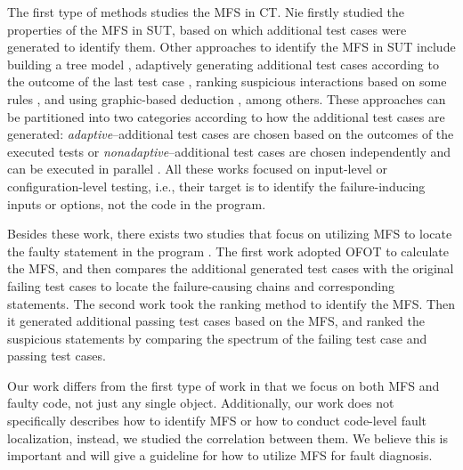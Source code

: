 \documentclass{sig-alternate-05-2015}
\begin{document}
The first type of methods studies the MFS in CT. Nie \cite{nie2011minimal} firstly studied the properties of the MFS in SUT, based on which additional test cases were generated to identify them. Other approaches to identify the MFS in SUT include building a tree model \cite{yilmaz2006covering}, adaptively generating additional test cases according to the outcome of the last test case \cite{zhang2011characterizing}, ranking suspicious interactions based on some rules \cite{ghandehari2012identifying}, and using graphic-based deduction \cite{martinez2008algorithms}, among others. These approaches can be partitioned into two categories \cite{colbourn2008locating} according to how the additional test cases are generated: \emph{adaptive}--additional test cases are chosen based on the outcomes of the executed tests \cite{shi2005software,nie2011minimal,ghandehari2012identifying,niu2013identifying,zhang2011characterizing,shakya2012isolating,wang2010adaptive,li2012improved}or \emph{nonadaptive}--additional test cases are chosen independently and can be executed in parallel \cite{yilmaz2006covering,colbourn2008locating,martinez2008algorithms,martinez2009locating,zhang2012faulty}. All these works focused on input-level or configuration-level testing, i.e., their target is to identify the failure-inducing inputs or options, not the code in the program.

Besides these work, there exists two studies that focus on utilizing MFS to locate the faulty statement in the program \cite{ma2013locating,ghandehari2013fault}. The first work \cite{ma2013locating} adopted OFOT \cite{nie2011minimal} to calculate the MFS, and then compares the additional generated test cases with the original failing test cases to locate the failure-causing chains and corresponding statements. The second work \cite{ghandehari2013fault} took the ranking method \cite{ghandehari2012identifying} to identify the MFS. Then  it generated additional passing test cases based on the MFS, and ranked the suspicious statements by comparing the spectrum of the failing test case and passing test cases.

Our work differs from the first type of work in that we focus on both MFS and faulty code, not just any single object. Additionally, our work does not specifically describes how to identify MFS or how to conduct code-level fault localization, instead, we studied the correlation between them. We believe this is important and will give a guideline for how to utilize MFS for fault diagnosis.
\end{document}
